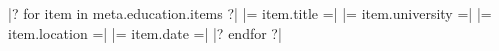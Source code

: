 


\begin{cvhonors}

|? for item in meta.education.items ?|
  \cvhonor
    {|= item.title =|} %
    {|= item.university =|} %
    {|= item.location =|} %
    {|= item.date =|} %
|? endfor ?|

\end{cvhonors}
